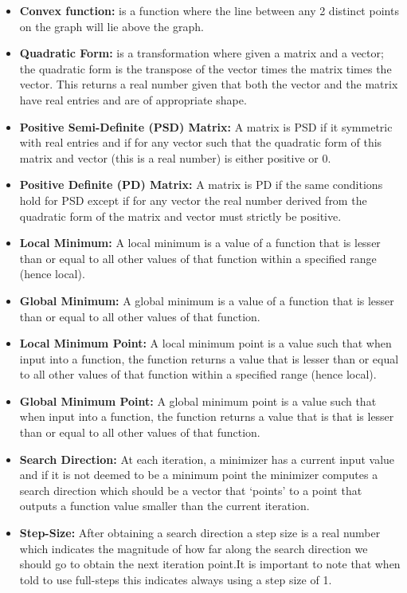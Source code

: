 \documentclass[12pt]{article}
\begin{document}
\begin{itemize}

\item \textbf{Convex function:} is a function where the line between any 2 distinct points on the graph will lie above the graph.
\item \textbf{Quadratic Form:} is a transformation where given a matrix and a vector; the quadratic form is the transpose of the vector times the matrix times the vector. This returns a real number given that both the vector and the matrix have real entries and are of appropriate shape.
\item \textbf{Positive Semi-Definite (PSD) Matrix:} A matrix is PSD if it symmetric with real entries and if for any vector such that the quadratic form of this matrix and vector (this is a real number) is either positive or 0.
\item \textbf{Positive Definite (PD) Matrix:} A matrix is PD if the same conditions hold for PSD except if for any vector the real number derived from the quadratic form of the matrix and vector must strictly be positive.
\item  \textbf{Local Minimum:} A local minimum is a value of a function that is lesser than or equal to all other values of that function within a specified range (hence local). 
\item \textbf{Global Minimum:} A global minimum is a value of a function that is lesser than or equal to all other values of that function.
\item  \textbf{Local Minimum Point:} A local minimum point is a value such that when input into a function, the function returns a value that is lesser than or equal to all other values of that function within a specified range (hence local). 
\item \textbf{Global Minimum Point:} A global minimum point is a value such that when input into a function, the function returns a value that is that is lesser than or equal to all other values of that function.
\item \textbf{Search Direction:} At each iteration, a minimizer has a current input value and if it is not deemed to be a minimum point the minimizer computes a search direction which should be a vector that `points' to a point that outputs a function value smaller than the current iteration.  
\item \textbf{Step-Size:} After obtaining a search direction a step size is a real number which indicates the magnitude of how far along the search direction we should go to obtain the next iteration point.It is important to note that when told to use full-steps this indicates always using a step size of 1. 

\end{itemize}
\end{document}
